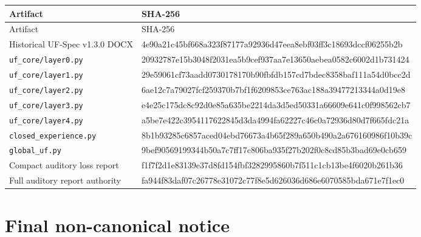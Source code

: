 \documentclass[11pt,oneside]{article}
\begin{document}
\begin{longtable}{>{\raggedright\arraybackslash}p{}
                  >{\ttfamily\small\raggedright\arraybackslash}p{}}
\toprule
Artifact & SHA-256\\
\midrule
\endfirsthead
\toprule
Artifact & SHA-256\\
\midrule
\endhead
Historical UF-Spec v1.3.0 DOCX &
4e90a21c45bf668a323f87177a92936d47eea8ebf03ff3c18693dccf06255b2b\\
\texttt{uf\_core/layer0.py} &
20932787e15b3048f2031ea5b9cef937aa7e13650aebea0582c6002d1b731424\\
\texttt{uf\_core/layer1.py} &
29e59061cf73aadd0730178170b90fbfdb157cd7bdec8358baf111a54d0bcc2d\\
\texttt{uf\_core/layer2.py} &
6ae12c7a79027fcf259370b7bf1f6209853ce763ac188a39477213344a0d19e8\\
\texttt{uf\_core/layer3.py} &
e4e25c175dc8c92d0e85a635be2214da3d5ed50331a66609e641c0f998562cb7\\
\texttt{uf\_core/layer4.py} &
a5be7e422c3954117622845d3da4994fa62227c46c0a72936d80d7f665fdc21a\\
\texttt{closed\_experience.py} &
8b1b93285c6857aced04ebd76673a4b65f289a650b490a2a676160986f10b39c\\
\texttt{global\_uf.py} &
9bef90569199344b50a7c7ff17c806ba935f27b202f0c8cd85b3bad69e0cb659\\
Compact auditory loss report &
f1f7f2d1e83139e37d8fd154fbf3282995860b7f511c1cb13be4f6020b261b36\\
Full auditory report authority &
fa944f83daf07c26778e31072c77f8e5d626036d686e6070585bda671e7f1ec0\\
\bottomrule
\end{longtable}

\section{Final non-canonical notice}

\begin{center}
\end{center}
\end{document}
